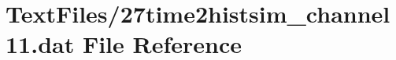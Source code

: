 \hypertarget{27time2histsim__channel11_8dat}{}\section{Text\+Files/27time2histsim\+\_\+channel11.dat File Reference}
\label{27time2histsim__channel11_8dat}
